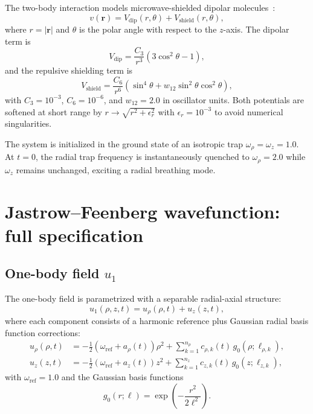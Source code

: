 \documentclass[aps,prl,onecolumn,superscriptaddress,longbibliography,nofootinbib]{revtex4-2}
\newcommand{\br}{\mathbf{r}}
\begin{document}
The two-body interaction models microwave-shielded dipolar
molecules~\cite{Karman2018}:
\begin{equation}
v(\br) = V_{\mathrm{dip}}(r,\theta) + V_{\mathrm{shield}}(r,\theta),
\end{equation}
where $r=|\br|$ and $\theta$ is the polar angle with respect to the
$z$-axis.  The dipolar term is
\begin{equation}
V_{\mathrm{dip}} = \frac{C_3}{r^3}(3\cos^2\theta - 1),
\end{equation}
and the repulsive shielding term is
\begin{equation}
V_{\mathrm{shield}} = \frac{C_6}{r^6}(\sin^4\theta
+ w_{12}\sin^2\theta\cos^2\theta),
\end{equation}
with $C_3=10^{-3}$, $C_6=10^{-6}$, and $w_{12}=2.0$ in oscillator
units.  Both potentials are softened at short range by
$r\to\sqrt{r^2+\epsilon_r^2}$ with $\epsilon_r=10^{-3}$ to avoid
numerical singularities.

The system is initialized in the ground state of an isotropic trap
$\omega_\rho=\omega_z=1.0$.  At $t=0$, the radial trap frequency is
instantaneously quenched to $\omega_\rho=2.0$ while $\omega_z$ remains
unchanged, exciting a radial breathing mode.

\section{Jastrow--Feenberg wavefunction: full specification}
\label{sec:wavefunction}

\subsection{One-body field $u_1$}

The one-body field is parametrized with a separable radial-axial
structure:
\begin{equation}
u_1(\rho,z,t) = u_\rho(\rho,t) + u_z(z,t),
\end{equation}
where each component consists of a harmonic reference plus Gaussian
radial basis function corrections:
\begin{align}
u_\rho(\rho,t) &= -\frac{1}{2}(\omega_{\mathrm{ref}}+a_\rho(t))\rho^2
+ \sum_{k=1}^{n_\rho}c_{\rho,k}(t)\,g_0(\rho;\ell_{\rho,k}),
\label{eq:u1_rho}\\
u_z(z,t) &= -\frac{1}{2}(\omega_{\mathrm{ref}}+a_z(t))z^2
+ \sum_{k=1}^{n_z}c_{z,k}(t)\,g_0(z;\ell_{z,k}),
\label{eq:u1_z}
\end{align}
with $\omega_{\mathrm{ref}}=1.0$ and the Gaussian basis functions
\begin{equation}
g_0(r;\ell) = \exp\!\left(-\frac{r^2}{2\ell^2}\right).
\end{equation}
\end{document}
